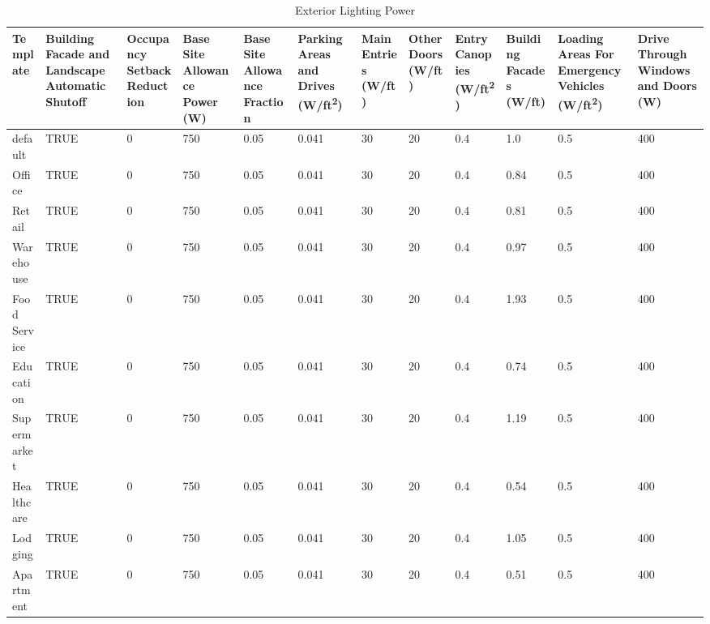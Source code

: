 \begin{table}
\centering
\scriptsize
\caption{Exterior Lighting Power}
\label{tab:exterior_lighting_power}
\begin{tabular}{|p{0.5in}|p{0.3in}|p{0.4in}|p{0.3in}|p{0.3in}|p{0.35in}|p{0.3in}|p{0.3in}|p{0.35in}|p{0.3in}|p{0.35in}|p{0.35in}|}
\hline
\textbf{Template} & \textbf{Building Facade and Landscape Automatic Shutoff} & \textbf{Occupancy Setback Reduction} & \textbf{Base Site Allowance Power (W)} & \textbf{Base Site Allowance Fraction} & \textbf{Parking Areas and Drives (W/ft\textsuperscript{2})} & \textbf{Main Entries (W/ft)} & \textbf{Other Doors (W/ft)} & \textbf{Entry Canopies (W/ft\textsuperscript{2})} & \textbf{Building Facades (W/ft)} & \textbf{Loading Areas For Emergency Vehicles (W/ft\textsuperscript{2})} & \textbf{Drive Through Windows and Doors (W)}  \\
\hline
default           & TRUE  & 0   &  750                    & 0.05   & 0.041    & 30 & 20 & 0.4  & 1.0  & 0.5   & 400 \\ \hline
Office            & TRUE  & 0   &  750                    & 0.05   & 0.041    & 30 & 20 & 0.4  & 0.84 & 0.5   & 400 \\ \hline
Retail            & TRUE  & 0   &  750                    & 0.05   & 0.041    & 30 & 20 & 0.4  & 0.81 & 0.5   & 400 \\ \hline
Warehouse         & TRUE  & 0   &  750                    & 0.05   & 0.041    & 30 & 20 & 0.4  & 0.97 & 0.5   & 400 \\ \hline
Food Service      & TRUE  & 0   &  750                    & 0.05   & 0.041    & 30 & 20 & 0.4  & 1.93 & 0.5   & 400 \\ \hline
Education         & TRUE  & 0   &  750                    & 0.05   & 0.041    & 30 & 20 & 0.4  & 0.74 & 0.5   & 400 \\ \hline
Supermarket       & TRUE  & 0   &  750                    & 0.05   & 0.041    & 30 & 20 & 0.4  & 1.19 & 0.5   & 400 \\ \hline
Healthcare        & TRUE  & 0   &  750                    & 0.05   & 0.041    & 30 & 20 & 0.4  & 0.54 & 0.5   & 400 \\ \hline
Lodging           & TRUE  & 0   &  750                    & 0.05   & 0.041    & 30 & 20 & 0.4  & 1.05 & 0.5   & 400 \\ \hline
Apartment         & TRUE  & 0   &  750                    & 0.05   & 0.041    & 30 & 20 & 0.4  & 0.51  & 0.5  & 400 \\ \hline
\end{tabular}
\end{table}